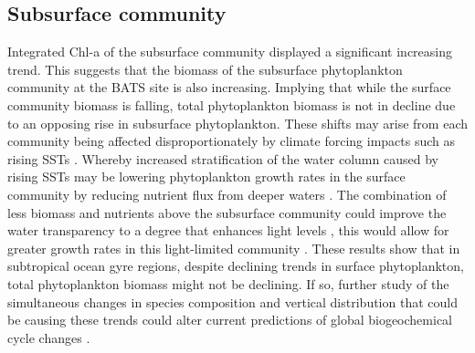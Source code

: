 \documentclass{article}
\begin{document}
\subsection{Subsurface community}
Integrated Chl-a of the subsurface community displayed a significant increasing trend. This suggests that the biomass of the subsurface phytoplankton community at the BATS site is also increasing. Implying that while the surface community biomass is falling, total phytoplankton biomass is not in decline due to an opposing rise in subsurface phytoplankton. These shifts may arise from each community being affected disproportionately by climate forcing impacts such as rising SSTs \citep{liu_variability_2019,sheppard_sea_2005}. Whereby increased stratification of the water column caused by rising SSTs may be lowering phytoplankton growth rates in the surface community by reducing nutrient flux from deeper waters \citep{boyce_dg_patterns_2015,schmittner_decline_2005}. The combination of less biomass and nutrients above the subsurface community could improve the water transparency to a degree that enhances light levels \citep{mcgillicuddy_covariation_2001}, this would allow for greater growth rates in this light-limited community \citep{cullen_subsurface_2015}. These results show that in subtropical ocean gyre regions, despite declining trends in surface phytoplankton, total phytoplankton biomass might not be declining. If so, further study of the simultaneous changes in species composition and vertical distribution that could be causing these trends could alter current predictions of global biogeochemical cycle changes \citep{mcmahon_millennial-scale_2015,boyce_global_2010,falkowski_role_1994,lomas_adaptive_2022}.
\end{document}
